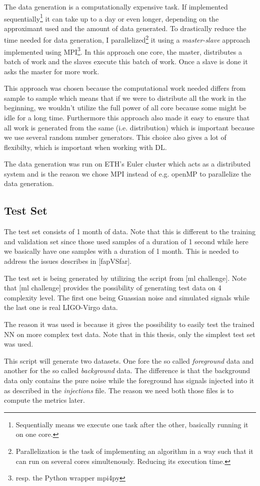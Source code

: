 The data generation is a computationally expensive task. If implemented
sequentially\footnote{Sequentially means we execute one task after the other,
basically running it on one core.} it can take
up to a day or even longer, depending on the approximant used and the
amount of data generated. To drastically reduce the time needed for data
generation, I parallelized\footnote{Parallelization is the task of implementing
an algorithm in a way such that it can run on several cores simultenously.
Reducing its execution time.} it using a \textit{master-slave} approach
implemented using MPI\footnote{resp. the Python wrapper mpi4py}. In
this approach one core, the master, distributes a batch of work and the slaves
execute this batch of work. Once a slave is done it asks the master for more
work.

This approach was chosen because the computational work needed differs from
sample to sample which means that if we were to distribute all the work in the
beginning, we wouldn't utilize the full power of all core because some might be
idle for a long time. Furthermore this approach also made it easy to ensure that
all work is generated from the same  (i.e. distribution) which is
important because we use several random number generators. This choice
also gives a lot of flexibilty, which is important when working with DL.

The data generation was run on ETH's Euler cluster which acts as a distributed
system and is the reason we chose MPI instead of e.g. openMP to parallelize the
data generation.

\subsection{Test Set}
The test set consists of 1 month of data. Note that this is different to the
training and validation set since those used samples of a duration of 1 second
while here we basically have one samples with a duration of 1 month. This is
needed to address the issues describes in [fapVSfar].

The test set is being generated by utilizing the  script
from [ml challenge]. Note that [ml challenge] provides the possibility of
generating test data on 4 complexity level. The first one being Guassian noise
and simulated signals while the last one is real LIGO-Virgo data.

The reason it was used is because it gives the possibility to easily test the
trained NN on more complex test data. Note that in this thesis, only the simplest
test set was used.

This script will generate two datasets. One fore the so called
\textit{foreground} data and another for the so called \textit{background} data.
The difference is that the background data only contains the pure noise
while the foreground has signals injected into it as described in the
\textit{injections} file. The reason we need both those files is to compute
the metrics later.
